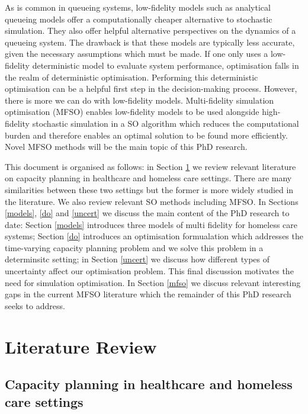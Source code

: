 \documentclass[12pt,a4paper]{article}
\begin{document}
As is common in queueing systems, low-fidelity models such as analytical queueing models offer a computationally cheaper alternative to stochastic simulation. They also offer helpful alternative perspectives on the dynamics of a queueing system. The drawback is that these models are typically less accurate, given the necessary assumptions which must be made. If one only uses a low-fidelity deterministic model to evaluate system performance, optimisation falls in the realm of deterministic optimisation. Performing this deterministic optimisation can be a helpful first step in the decision-making process. However, there is more we can do with low-fidelity models. Multi-fidelity simulation optimisation (MFSO) enables low-fidelity models to be used alongside high-fidelity stochastic simulation in a SO algorithm which reduces the computational burden and therefore enables an optimal solution to be found more efficiently. Novel MFSO methods will be the main topic of this PhD research.

This document is organised as follows: in Section \ref{lit-rev} we review relevant literature on capacity planning in healthcare and  homeless care settings. There are many similarities between these two settings but the former is more widely studied in the literature. We also review relevant SO methods including MFSO. In Sections \ref{models}, \ref{do} and \ref{uncert} we discuss the main content of the PhD research to date: Section \ref{models} introduces three models of multi fidelity for homeless care systems; Section \ref{do} introduces an optimisation formualation which addresses the time-varying capacity planning problem and we solve this problem in a determinsitc setting; in Section \ref{uncert} we discuss how different types of uncertainty affect our optimisation problem. This final discussion motivates the need for simulation optimisation. In Section \ref{mfso} we discuss relevant interesting gaps in the current MFSO literature which the remainder of this PhD research seeks to address.

\newpage

\section{Literature Review} \label{lit-rev}

\subsection{Capacity planning in healthcare and homeless care settings}
\end{document}
